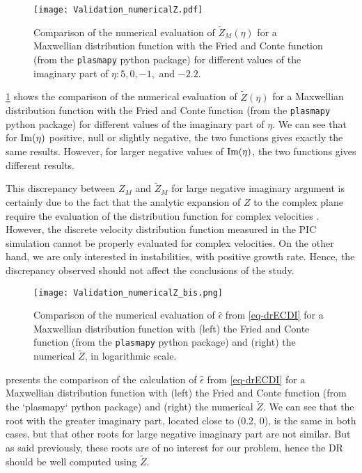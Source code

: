   \begin{figure}[!hbt]
    \centering
    \texttt{[image: Validation\_numericalZ.pdf]}
    \caption{Comparison of the numerical evaluation of $\tilde{Z}_M(\eta)$ for a Maxwellian distribution function with the Fried and Conte function (from the \texttt{plasmapy} python package) for different values of the imaginary part of $\eta: 5, 0,-1,$ and $-2.2$.  }
    \label{fig-numZ}
  \end{figure}
  \cref{fig-numZ} shows the comparison of the numerical evaluation of $\tilde{Z}(\eta)$ for a Maxwellian distribution function with the Fried and Conte function (from the \texttt{plasmapy} python package) for different values of the imaginary part of $\eta$.
  We can see that for ${\rm Im}(\eta)$ positive, null or slightly negative, the two functions gives exactly the same results.
  However, for larger negative values of ${\rm Im}(\eta)$, the two functions gives different results.
  
  This discrepancy between $Z_M$ and $\tilde{Z}_M$ for large negative imaginary argument is certainly due to the fact that the analytic expansion of $Z$ to the complex plane require the evaluation of the distribution function for complex velocities \citep{xie2013,weideman1995}.
  However, the discrete velocity distribution function measured in the \ac{PIC} simulation cannot be properly evaluated for complex velocities.
  On the other hand, we are only interested in instabilities, with positive growth rate.
  Hence, the discrepancy observed should not affect the conclusions of the study.
  


  \begin{figure}[hbt]
    \centering
    \texttt{[image: Validation\_numericalZ\_bis.png]}
    \caption{Comparison of the numerical evaluation of $\hat\epsilon$ from \cref{eq-drECDI} for a Maxwellian distribution function with (left) the Fried and Conte function (from the \texttt{plasmapy} python package) and (right) the numerical $\tilde{Z}$, in logarithmic scale.  }
    \label{fig-numZbis}
  \end{figure}
  
   presents the comparison of the calculation of $\hat\epsilon$ from \cref{eq-drECDI} for a Maxwellian distribution function with (left) the Fried and Conte function (from the `plasmapy` python package) and (right) the numerical $\tilde{Z}$.
  We can see that the root with the greater imaginary part, located close to (0.2, 0), is the same in both cases, but that other roots for large negative imaginary part are not similar.
  But as said previously, these roots are of no interest for our problem, hence the \ac{DR} should be well computed using $\tilde{Z}$.
  

